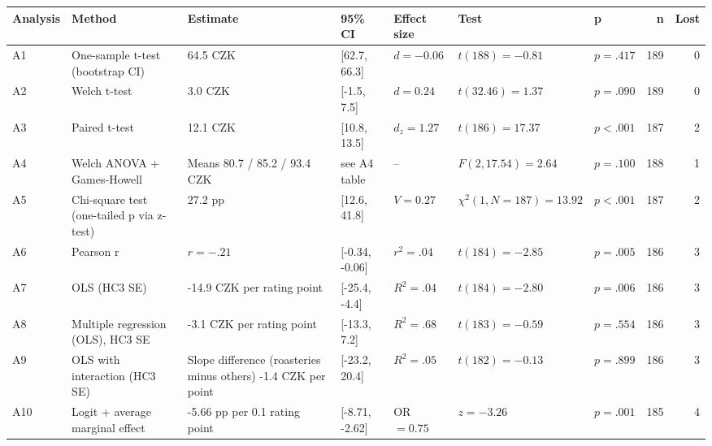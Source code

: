 \begin{tabular}{lllllllrr}
\toprule
Analysis & Method & Estimate & 95\% CI & Effect size & Test & p & n & Lost \\
\midrule
A1 & One-sample t-test (bootstrap CI) & 64.5 CZK & [62.7, 66.3] & $d=-0.06$ & $t(188)=-0.81$ & $p=.417$ & 189 & 0 \\
A2 & Welch t-test & 3.0 CZK & [-1.5, 7.5] & $d=0.24$ & $t(32.46)=1.37$ & $p=.090$ & 189 & 0 \\
A3 & Paired t-test & 12.1 CZK & [10.8, 13.5] & $d_z=1.27$ & $t(186)=17.37$ & $p<.001$ & 187 & 2 \\
A4 & Welch ANOVA + Games-Howell & Means 80.7 / 85.2 / 93.4 CZK & see A4 table & -- & $F(2, 17.54)=2.64$ & $p=.100$ & 188 & 1 \\
A5 & Chi-square test (one-tailed p via z-test) & 27.2 pp & [12.6, 41.8] & $V=0.27$ & $\chi^2(1, N=187)=13.92$ & $p<.001$ & 187 & 2 \\
A6 & Pearson r & $r=-.21$ & [-0.34, -0.06] & $r^2=.04$ & $t(184)=-2.85$ & $p=.005$ & 186 & 3 \\
A7 & OLS (HC3 SE) & -14.9 CZK per rating point & [-25.4, -4.4] & $R^2=.04$ & $t(184)=-2.80$ & $p=.006$ & 186 & 3 \\
A8 & Multiple regression (OLS), HC3 SE & -3.1 CZK per rating point & [-13.3, 7.2] & $R^2=.68$ & $t(183)=-0.59$ & $p=.554$ & 186 & 3 \\
A9 & OLS with interaction (HC3 SE) & Slope difference (roasteries minus others) -1.4 CZK per point & [-23.2, 20.4] & $R^2=.05$ & $t(182)=-0.13$ & $p=.899$ & 186 & 3 \\
A10 & Logit + average marginal effect & -5.66 pp per 0.1 rating point & [-8.71, -2.62] & OR $=0.75$ & $z=-3.26$ & $p=.001$ & 185 & 4 \\
\bottomrule
\end{tabular}
